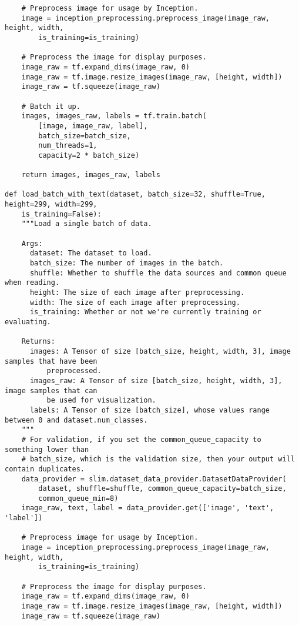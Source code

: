 \begin{lstlisting}
    # Preprocess image for usage by Inception.
    image = inception_preprocessing.preprocess_image(image_raw, height, width, 
        is_training=is_training)

    # Preprocess the image for display purposes.
    image_raw = tf.expand_dims(image_raw, 0)
    image_raw = tf.image.resize_images(image_raw, [height, width])
    image_raw = tf.squeeze(image_raw)

    # Batch it up.
    images, images_raw, labels = tf.train.batch(
        [image, image_raw, label],
        batch_size=batch_size,
        num_threads=1,
        capacity=2 * batch_size)
    
    return images, images_raw, labels

def load_batch_with_text(dataset, batch_size=32, shuffle=True, height=299, width=299, 
    is_training=False):
    """Load a single batch of data. 
    
    Args:
      dataset: The dataset to load.
      batch_size: The number of images in the batch.
      shuffle: Whether to shuffle the data sources and common queue when reading.
      height: The size of each image after preprocessing.
      width: The size of each image after preprocessing.
      is_training: Whether or not we're currently training or evaluating.
    
    Returns:
      images: A Tensor of size [batch_size, height, width, 3], image samples that have been 
          preprocessed.
      images_raw: A Tensor of size [batch_size, height, width, 3], image samples that can 
          be used for visualization.
      labels: A Tensor of size [batch_size], whose values range between 0 and dataset.num_classes.
    """
    # For validation, if you set the common_queue_capacity to something lower than
    # batch_size, which is the validation size, then your output will contain duplicates.
    data_provider = slim.dataset_data_provider.DatasetDataProvider(
        dataset, shuffle=shuffle, common_queue_capacity=batch_size,
        common_queue_min=8)
    image_raw, text, label = data_provider.get(['image', 'text', 'label'])
    
    # Preprocess image for usage by Inception.
    image = inception_preprocessing.preprocess_image(image_raw, height, width, 
        is_training=is_training)

    # Preprocess the image for display purposes.
    image_raw = tf.expand_dims(image_raw, 0)
    image_raw = tf.image.resize_images(image_raw, [height, width])
    image_raw = tf.squeeze(image_raw)


\end{lstlisting}
